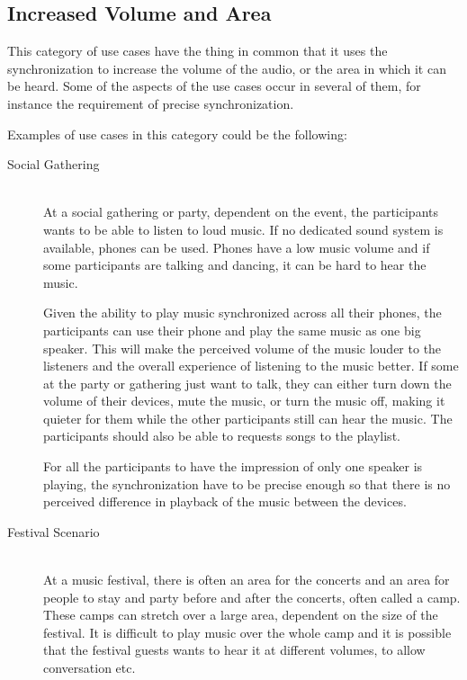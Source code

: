 \subsection{Increased Volume and Area}
This category of use cases have the thing in common that it uses the synchronization to increase the volume of the audio, or the area in which it can be heard.
Some of the aspects of the use cases occur in several of them, for instance the requirement of precise synchronization.

Examples of use cases in this category could be the following:

\begin{description}
    \item[Social Gathering] \hfill\\
        At a social gathering or party, dependent on the event, the participants wants to be able to listen to loud music.
        If no dedicated sound system is available, phones can be used. 
        Phones have a low music volume and if some participants are talking and dancing, it can be hard to hear the music.

        Given the ability to play music synchronized across all their phones, the participants can use their phone and play the same music as one big speaker.
        This will make the perceived volume of the music louder to the listeners and the overall experience of listening to the music better.
        If some at the party or gathering just want to talk, they can either turn down the volume of their devices, mute the music, or turn the music off,
        making it quieter for them while the other participants still can hear the music.
        The participants should also be able to requests songs to the playlist.

        For all the participants to have the impression of only one speaker is playing, 
        the synchronization have to be precise enough so that there is no perceived difference in playback of the music between the devices.

    \item[Festival Scenario] \hfill\\
        At a music festival, there is often an area for the concerts and an area for people to stay and party before and after the concerts, often called a camp.
        These camps can stretch over a large area, dependent on the size of the festival.
        It is difficult to play music over the whole camp and it is possible that the festival guests wants to hear it at different volumes, to allow conversation etc.


\end{description}
